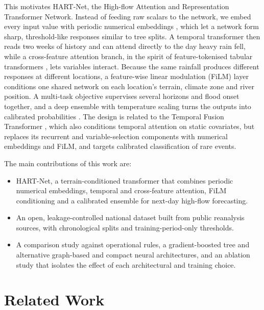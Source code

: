 \documentclass[conference]{IEEEtran}
\newcommand{\model}{HART-Net}
\begin{document}
This motivates \model{}, the High-flow Attention and Representation Transformer
Network. Instead of feeding raw scalars to the network, we embed
every input value with periodic numerical embeddings \cite{gorishniy2022}, which
let a network form sharp, threshold-like responses similar to tree splits. A
temporal transformer \cite{vaswani2017} then reads two weeks of history and can
attend directly to the day heavy rain fell, while a cross-feature attention
branch, in the spirit of feature-tokenised tabular transformers
\cite{gorishniy2021}, lets variables interact. Because the same rainfall
produces different responses at different locations, a feature-wise linear
modulation (FiLM) layer \cite{perez2018} conditions one shared network on each
location's terrain, climate zone and river position. A multi-task objective
supervises several horizons and flood onset together, and a deep ensemble with
temperature scaling turns the outputs into calibrated probabilities
\cite{lakshminarayanan2017,guo2017}. The design is related to the Temporal
Fusion Transformer \cite{lim2021}, which also conditions temporal attention on
static covariates, but replaces its recurrent and variable-selection components
with numerical embeddings and FiLM, and targets calibrated classification of
rare events.

The main contributions of this work are:
\begin{itemize}
\item \model{}, a terrain-conditioned transformer that combines periodic
numerical embeddings, temporal and cross-feature attention, FiLM conditioning
and a calibrated ensemble for next-day high-flow forecasting.
\item An open, leakage-controlled national dataset built from public reanalysis
sources, with chronological splits and training-period-only thresholds.
\item A comparison study against operational rules, a gradient-boosted tree and
alternative graph-based and compact neural architectures, and an ablation study that isolates the
effect of each architectural and training choice.
\end{itemize}

\section{Related Work}
\end{document}
